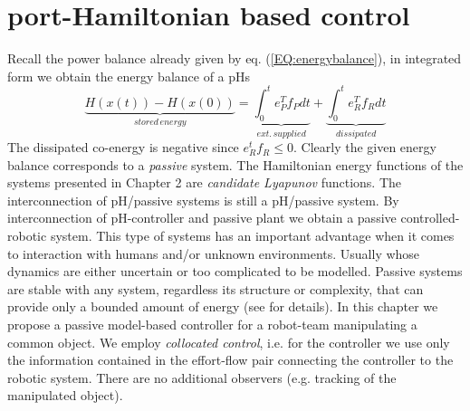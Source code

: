 \documentclass[a4paper,twoside, openright,12pt]{report}
\begin{document}
\chapter{port-Hamiltonian based control}
Recall the power balance already given by eq. (\ref{EQ:energybalance}), in integrated form we obtain the energy balance of a pHs
\begin{equation}
\underbrace{H(x(t))-H(x(0))}_{stored\, energy} = \underbrace{\int_0^t e_P^Tf_P dt}_{ext.\, supplied} + \underbrace{\int_0^te_R^Tf_R dt}_{dissipated} 
\end{equation}
The dissipated co-energy is negative since $e_R^tf_R \leq 0$. Clearly the given energy balance corresponds to a \emph{passive} system. The Hamiltonian energy functions of the systems presented in Chapter 2 are \emph{candidate Lyapunov} functions. The interconnection of pH/passive systems is still a pH/passive system. By interconnection of pH-controller and passive plant we obtain a passive controlled-robotic system. This type of systems has an important advantage when it comes to interaction with humans and/or unknown environments. Usually whose dynamics are either uncertain or too complicated to be modelled. Passive systems are stable with any system, regardless its structure or complexity, that can provide only a bounded amount of energy (see \cite{Stramigioli_15} for details). In this chapter we propose a passive model-based controller for a robot-team manipulating a common object. We employ \emph{collocated control}, i.e. for the controller we use only the information contained in the effort-flow pair connecting the controller to the robotic system. There are no additional observers (e.g. tracking of the manipulated object).
\end{document}
